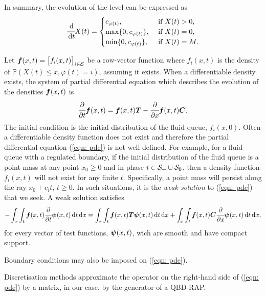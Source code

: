 In summary, the evolution of the level can be expressed as 
\[\cfrac{\, \mathrm{d}}{\, \mathrm{d} t} X(t) = \begin{cases} c_{\varphi(t)}, & \mbox{ if } X(t)>0, \\ \max\{0,c_{\varphi(t)}\}, & \mbox{ if } X(t)=0, \\ \min\{0,c_{\varphi(t)}\}, & \mbox{ if } X(t)=M.  \end{cases}\]

Let \(\boldsymbol f(x,t) = \begin{bmatrix} f_i(x,t) \end{bmatrix}_{i\in\mathcal{S}}\) be a row-vector function where \(f_i(x,t)\) is the density of \(\mathbb P(X(t)\leq x, \varphi(t) = i)\), assuming it exists. When a differentiable density exists, the system of partial differential equation which describes the evolution of the densities \(\boldsymbol f(x,t)\) is 
\begin{equation}
	\cfrac{\partial}{\partial t} \boldsymbol f(x,t) = \boldsymbol f(x,t)\boldsymbol T - \cfrac{\partial}{\partial x}\boldsymbol f(x,t)\boldsymbol C.\label{eqn: pde}
\end{equation}
The initial condition is the initial distribution of the fluid queue, \(f_i(x,0)\). Often a differentiable density function does not exist and therefore the partial differential equation (\ref{eqn: pde}) is not well-defined. For example, for a fluid queue with a regulated boundary, if the initial distribution of the fluid queue is a point mass at any point \(x_0\geq 0\) and in phase \(i\in\mathcal{S}_+\cup\mathcal{S}_0\), then a density function \(f_i(x,t)\) will not exist for any finite \(t\). Specifically, a point mass will persist along the ray \(x_0+c_it\), \(t\geq 0\). In such situations, it is the \emph{weak solution} to (\ref{eqn: pde}) that we seek. A weak solution satisfies
\begin{equation}
	-\int_x\int_t \boldsymbol f(x,t)\cfrac{\partial}{\partial t} \boldsymbol \psi(x,t)\, \mathrm{d} t \, \mathrm{d} x= \int_{x}\int_t\boldsymbol f(x,t)\boldsymbol T\boldsymbol \psi(x,t)\, \mathrm{d} t \, \mathrm{d} x + \int_x\int_t\boldsymbol f(x,t)\boldsymbol C \cfrac{\partial}{\partial x} \boldsymbol \psi(x,t)\, \mathrm{d} t \, \mathrm{d} x,\label{eqn: weak pde}
\end{equation}
for every vector of test functions, \(\boldsymbol \psi(x,t)\), wich are smooth and have compact support.

Boundary conditions may also be imposed on (\ref{eqn: pde}). 

Discretisation methods approximate the operator on the right-hand side of (\ref{eqn: pde}) by a matrix, in our case, by the generator of a QBD-RAP. 

